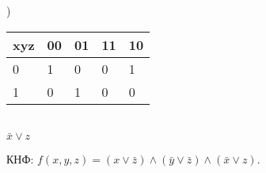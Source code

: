 \documentclass{article}
\begin{document}
	\begin{table}[h!]
		)\\
		\vspace{5pt}
		\begin{tabular}{|l|l|l|l|l|}
			\hline
			xyz & 00                        & 01 & 11 & 10                        \\ \hline
			0   & 1                         & 0  & 0  & 1                         \\ \hline
			1   & \cellcolor[HTML]{EBDC25}0 & 1  & 0  & \cellcolor[HTML]{EBDC25}0 \\ \hline
		\end{tabular}
		\vspace{5pt}
		\\$\bar{x} \vee z$
	\end{table}
	
	КНФ: $f(x, y, z) = (x \vee \bar{z}) \wedge (\bar{y} \vee \bar{z}) \wedge (\bar{x} \vee z).$
	
\end{document}
